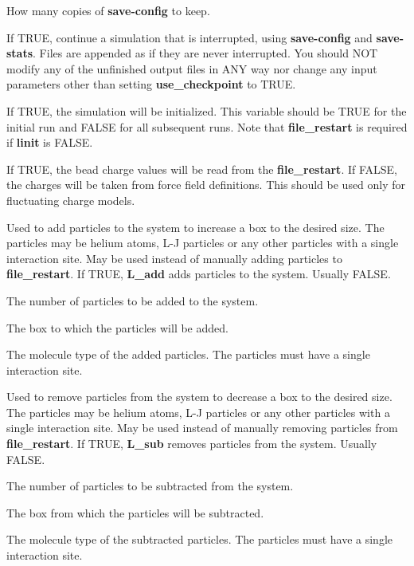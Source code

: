 \documentclass[12pt,letterpaper]{article}
\begin{document}
 How many copies of {\bf save-config} to keep.

 If TRUE, continue a
simulation that is interrupted, using {\bf save-config} and
{\bf save-stats}. Files are appended as if they are never
interrupted. You should NOT modify any of the unfinished
output files in ANY way nor change any input parameters
other than setting \textbf{use\_checkpoint} to TRUE.

 If TRUE, the simulation will be
initialized. This variable should be TRUE for the initial
run and FALSE for all subsequent runs. Note that {\bf
  file\_restart} is required if {\bf linit} is FALSE.

 If TRUE, the bead charge values will
be read from the {\bf file\_restart}. If FALSE, the charges
will be taken from force field definitions. This should be
used only for fluctuating charge models.

 Used to add particles to the system
to increase a box to the desired size. The particles may be
helium atoms, L-J particles or any other particles with a
single interaction site. May be used instead of manually
adding particles to {\bf file\_restart}. If TRUE, {\bf
  L\_add} adds particles to the system. Usually FALSE.

 The number of particles to be added to the system.

 The box to which the particles will be added.

 The molecule type of the added
particles. The particles must have a single interaction
site.

 Used to remove particles from the
system to decrease a box to the desired size. The particles
may be helium atoms, L-J particles or any other particles
with a single interaction site. May be used instead of
manually removing particles from {\bf file\_restart}. If
TRUE, {\bf L\_sub} removes particles from the system.
Usually FALSE.

 The number of particles to be subtracted from the system.

  The box from which the particles will be subtracted.

 The molecule type of the
subtracted particles. The particles must have a single
interaction site.
\end{document}
